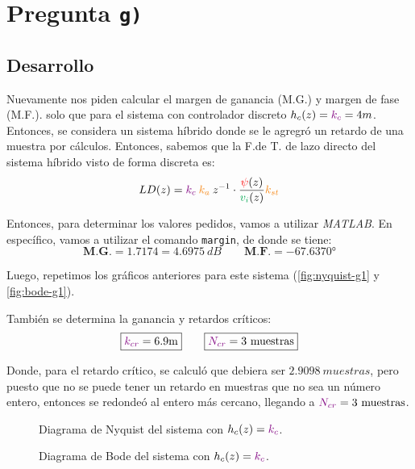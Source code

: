 \section{Pregunta \texttt{g)}}\label{pregunta-g}


\subsection{Desarrollo}

Nuevamente nos piden calcular el margen de ganancia (M.G.) y margen de fase
(M.F.). solo que para el sistema con controlador discreto \(h_c(z)= \mathbin{\color{violet}k_c} = 4m\).
Entonces, se considera un sistema híbrido donde se le agregró un retardo de una
muestra por cálculos. Entonces, sabemos  que la F.de T. de lazo directo del sistema
híbrido visto de forma discreta es:
\begin{equation}
  LD(z) = \mora{k_{c}} \nara{ k_{a}} z^{-1} \cdot \frac{\rojo{\psi}(z)}{\verd{v_i}(z)} \nara{k_{st}}  
\end{equation}

Entonces, para determinar los valores pedidos, vamos a utilizar  \textit{MATLAB}.
En específico, vamos a utilizar el comando \texttt{margin}, de donde se tiene:
\begin{equation}
  \boxed{\textbf{M.G.} = 1.7174 = 4.6975\ \unit{dB}} \qquad \boxed{\textbf{M.F.} = \ang{-67.6370}}
\end{equation}

Luego, repetimos los gráficos anteriores para este sistema (\autoref{fig:nyquist-g1}
y \autoref{fig:bode-g1}).

También se determina la ganancia y retardos críticos:
\begin{equation}
  \boxed{\mora{k_{cr}} = 6.9\unit{m}} \qquad \boxed{\mora{N_{cr}} = 3\ \unit{muestras}}
\end{equation}

Donde, para el retardo crítico, se calculó que debiera ser $2.9098\ \unit{muestras}$,
pero puesto que no se puede tener un retardo en muestras que no sea un número entero,
entonces se redondeó al entero más cercano, llegando a $\mora{N_{cr}} = 3\ \unit{muestras}$.

\begin{figure}[h]
  \centering
  
  \caption{Diagrama de Nyquist del sistema con $h_{c}(z) = \mathbin{\color{violet}k_{c}}$.}
  \label{fig:nyquist-g1}
\end{figure}

\begin{figure}[h]
  \centering
  
  \caption{Diagrama de Bode del sistema con $h_{c}(z) = \mathbin{\color{violet}k_{c}}$.}
  \label{fig:bode-g1}
\end{figure}

